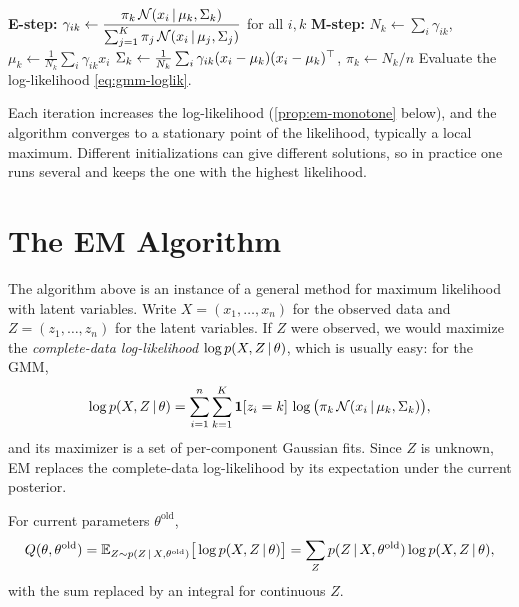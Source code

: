 \begin{algorithm}[H]
\caption{EM for Gaussian Mixtures}\label{alg:em-gmm}
\begin{algorithmic}[1]
\Repeat
  \State \textbf{E-step:} $\gamma_{ik}\gets\dfrac{\pi_k\,\mathcal{N}(x_i\,|\,\mu_k,\Sigma_k)}{\sum_{j=1}^K\pi_j\,\mathcal{N}(x_i\,|\,\mu_j,\Sigma_j)}$ for all $i,k$
  \State \textbf{M-step:} $N_k\gets\sum_i\gamma_{ik}$, \quad $\mu_k\gets\frac1{N_k}\sum_i\gamma_{ik}x_i$
  \State {} $\Sigma_k\gets\frac1{N_k}\sum_i\gamma_{ik}(x_i-\mu_k)(x_i-\mu_k)^{\top}$, \quad $\pi_k\gets N_k/n$ 
  \State Evaluate the log-likelihood \eqref{eq:gmm-loglik}.
\end{algorithmic}
\end{algorithm}

Each iteration increases the log-likelihood (\cref{prop:em-monotone} below), and the algorithm converges to a stationary point of the likelihood, typically a local maximum. Different initializations can give different solutions, so in practice one runs several and keeps the one with the highest likelihood.

\section{The EM Algorithm}\label{sec:em}

The algorithm above is an instance of a general method for maximum likelihood with latent variables. Write $X=(x_1,\dots,x_n)$ for the observed data and $Z=(z_1,\dots,z_n)$ for the latent variables. If $Z$ were observed, we would maximize the \emph{complete-data log-likelihood} $\log p(X,Z\,|\,\theta)$, which is usually easy: for the GMM,
\[
\log p(X,Z\,|\,\theta)=\sum_{i=1}^n\sum_{k=1}^K\mathbf{1}[z_i=k]\,\log\big(\pi_k\,\mathcal{N}(x_i\,|\,\mu_k,\Sigma_k)\big),
\]
and its maximizer is a set of per-component Gaussian fits. Since $Z$ is unknown, EM replaces the complete-data log-likelihood by its expectation under the current posterior.

\begin{definition}\label{def:em-q}
For current parameters $\theta^{\mathrm{old}}$,
\[
Q(\theta,\theta^{\mathrm{old}})=\mathbb{E}_{Z\sim p(Z\,|\, X,\theta^{\mathrm{old}})}\big[\log p(X,Z\,|\,\theta)\big]=\sum_Zp(Z\,|\, X,\theta^{\mathrm{old}})\log p(X,Z\,|\,\theta),
\]
with the sum replaced by an integral for continuous $Z$.
\end{definition}

